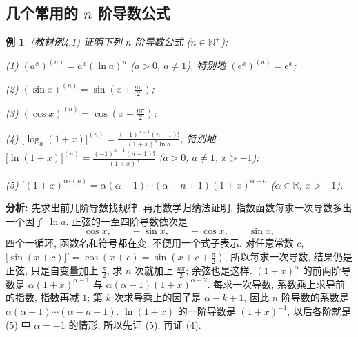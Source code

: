 \documentclass[UTF8,openany]{ctexbook}
\theoremstyle{chinesetextbook}
\newtheorem{example}{例}[section]
\begin{document}
\subsection{\texorpdfstring{几个常用的 $n$ 阶导数公式}{几个常用的 n 阶导数公式}}
\begin{example}\label{ex:c2-4-1}
\textnormal{(教材例4.1)} 证明下列 $n$ 阶导数公式 ($n\in\mathbb N^+$):

(1) $(a^x)^{(n)}=a^x(\ln a)^n$ ($a>0$, $a\ne1$), 特别地 $(e^x)^{(n)}=e^x$;

(2) $\displaystyle(\sin x)^{(n)}=\sin\left(x+\frac{n\pi}2\right)$;

(3) $\displaystyle(\cos x)^{(n)}=\cos\left(x+\frac{n\pi}2\right)$;

(4) $\displaystyle\bigl[\log_a(1+x)\bigr]^{(n)}=\frac{(-1)^{n-1}(n-1)!}{(1+x)^n\ln a}$, 特别地 $\displaystyle\bigl[\ln(1+x)\bigr]^{(n)}=\frac{(-1)^{n-1}(n-1)!}{(1+x)^n}$ ($a>0$, $a\ne1$, $x>-1$);

(5) $\bigl[(1+x)^\alpha\bigr]^{(n)}=\alpha(\alpha-1)\cdots(\alpha-n+1)(1+x)^{\alpha-n}$ ($\alpha\in\mathbb R$, $x>-1$).
\end{example}
\par\indent\textbf{分析:} 先求出前几阶导数找规律, 再用数学归纳法证明. 指数函数每求一次导数多出一个因子 $\ln a$. 正弦的一至四阶导数依次是
\[
\cos x,\qquad-\sin x,\qquad-\cos x,\qquad\sin x,
\]
四个一循环, 函数名和符号都在变, 不便用一个式子表示. 对任意常数 $c$, $\displaystyle\bigl[\sin(x+c)\bigr]'=\cos(x+c)=\sin\left(x+c+\frac\pi2\right)$, 所以每求一次导数, 结果仍是正弦, 只是自变量加上 $\displaystyle\frac\pi2$, 求 $n$ 次就加上 $\displaystyle\frac{n\pi}2$; 余弦也是这样. $(1+x)^\alpha$ 的前两阶导数是 $\alpha(1+x)^{\alpha-1}$ 与 $\alpha(\alpha-1)(1+x)^{\alpha-2}$. 每求一次导数, 系数乘上求导前的指数, 指数再减 $1$; 第 $k$ 次求导乘上的因子是 $\alpha-k+1$, 因此 $n$ 阶导数的系数是 $\alpha(\alpha-1)\cdots(\alpha-n+1)$. $\ln(1+x)$ 的一阶导数是 $(1+x)^{-1}$, 以后各阶就是 (5) 中 $\alpha=-1$ 的情形, 所以先证 (5), 再证 (4).
\end{document}
